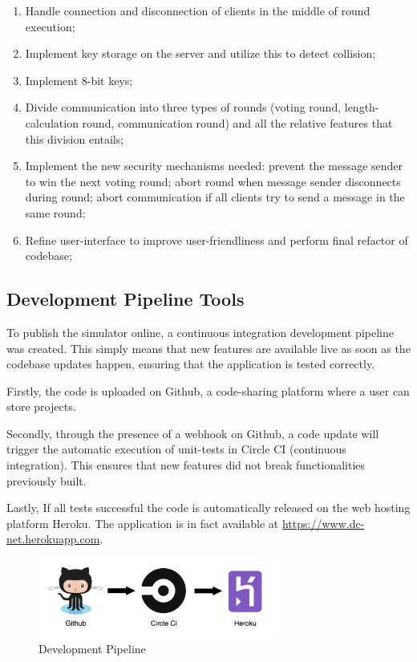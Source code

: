 \begin{enumerate}
    \item Handle connection and disconnection of clients in the middle of round execution;
    \item Implement key storage on the server and utilize this to detect collision;
    \item Implement 8-bit keys;
    \item Divide communication into three types of rounds (voting round, length-calculation round, communication round) and all the relative features that this division entails;
    \item Implement the new security mechanisms needed: prevent the message sender to win the next voting round; abort round when message sender disconnects during round; abort communication if all clients try to send a message in the same round;
    \item Refine user-interface to improve user-friendliness and perform final refactor of codebase;
\end{enumerate}


\subsection{Development Pipeline Tools}
To publish the simulator online, a continuous integration development pipeline was created. This simply means that new features are available live as soon as the codebase updates happen, ensuring that the application is tested correctly. \newline

Firstly, the code is uploaded on Github, a code-sharing platform where a user can store projects.

Secondly, through the presence of a webhook on Github, a code update will trigger the automatic execution of unit-tests in Circle CI (continuous integration). This ensures that new features did not break functionalities previously built.

Lastly, If all tests successful the code is automatically released on the web hosting platform Heroku. The application is in fact available at \url{https://www.dc-net.herokuapp.com}.

\begin{figure}[h!]
    \centering
    \includegraphics[width=0.70\textwidth]{Images/pipeline.png}
    \caption{Development Pipeline}
    \label{fig:devPipeline}
\end{figure}

